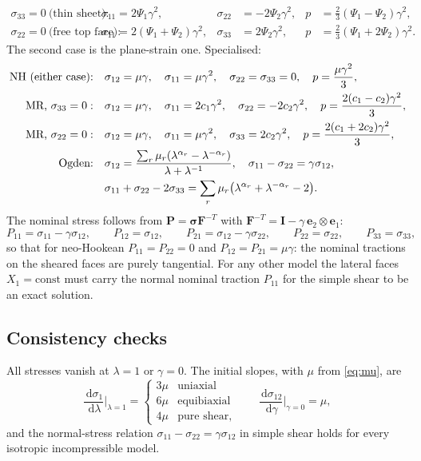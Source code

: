 \documentclass[11pt]{article}
\newcommand{\ud}{\,\mathrm{d}}
\newcommand{\be}{\bm{e}}
\newcommand{\bsig}{\bm{\sigma}}
\newcommand{\bP}{\bm{P}}
\newcommand{\bF}{\bm{F}}
\newcommand{\bI}{\bm{I}}
\newcommand{\Pone}{\Psi_{1}}
\newcommand{\Ptwo}{\Psi_{2}}
\begin{document}
\begin{align}
  \sigma_{33} = 0\ \text{(thin sheet):}\quad &
  \sigma_{11} = 2\Pone\gamma^2, & \sigma_{22} &= -2\Ptwo\gamma^2, &
  p &= \tfrac23(\Pone - \Ptwo)\gamma^2, \\
  \sigma_{22} = 0\ \text{(free top face):}\quad &
  \sigma_{11} = 2(\Pone + \Ptwo)\gamma^2, & \sigma_{33} &= 2\Ptwo\gamma^2, &
  p &= \tfrac23(\Pone + 2\Ptwo)\gamma^2 .
\end{align}
The second case is the plane-strain one.
Specialised:
\begin{align}
  \text{NH (either case):}\quad & \sigma_{12} = \mu\gamma, \quad \sigma_{11} = \mu\gamma^2, \quad
  \sigma_{22} = \sigma_{33} = 0, \quad p = \frac{\mu\gamma^2}{3}, \\
  \text{MR, } \sigma_{33} = 0:\quad & \sigma_{12} = \mu\gamma, \quad \sigma_{11} = 2c_1\gamma^2, \quad
  \sigma_{22} = -2c_2\gamma^2, \quad p = \frac{2(c_1 - c_2)\gamma^2}{3}, \\
  \text{MR, } \sigma_{22} = 0:\quad & \sigma_{12} = \mu\gamma, \quad \sigma_{11} = \mu\gamma^2, \quad
  \sigma_{33} = 2c_2\gamma^2, \quad p = \frac{2(c_1 + 2c_2)\gamma^2}{3}, \\
  \text{Ogden:}\quad & \sigma_{12} = \frac{\sum_r\mu_r(\lambda^{\alpha_r} - \lambda^{-\alpha_r})}{\lambda + \lambda^{-1}}, \quad
  \sigma_{11} - \sigma_{22} = \gamma\sigma_{12}, \notag \\
  & \sigma_{11} + \sigma_{22} - 2\sigma_{33} = \sum_r\mu_r\bigl(\lambda^{\alpha_r} + \lambda^{-\alpha_r} - 2\bigr).
\end{align}
The nominal stress follows from $\bP = \bsig\bF^{-T}$ with
$\bF^{-T} = \bI - \gamma\,\be_2\otimes\be_1$:
\begin{equation}
  P_{11} = \sigma_{11} - \gamma\sigma_{12}, \qquad
  P_{12} = \sigma_{12}, \qquad
  P_{21} = \sigma_{12} - \gamma\sigma_{22}, \qquad
  P_{22} = \sigma_{22}, \qquad
  P_{33} = \sigma_{33},
\end{equation}
so that for neo-Hookean $P_{11} = P_{22} = 0$ and $P_{12} = P_{21} = \mu\gamma$:
the nominal tractions on the sheared faces are purely tangential.  For any
other model the lateral faces $X_1 = \text{const}$ must carry the normal
nominal traction $P_{11}$ for the simple shear to be an exact solution.

\subsection{Consistency checks}
All stresses vanish at $\lambda = 1$ or $\gamma = 0$.  The initial slopes,
with $\mu$ from \eqref{eq:mu}, are
\begin{equation}
  \frac{\ud\sigma_1}{\ud\lambda}\Big|_{\lambda=1} =
  \begin{cases} 3\mu & \text{uniaxial} \\ 6\mu & \text{equibiaxial} \\ 4\mu & \text{pure shear}, \end{cases}
  \qquad
  \frac{\ud\sigma_{12}}{\ud\gamma}\Big|_{\gamma=0} = \mu ,
\end{equation}
and the normal-stress relation $\sigma_{11} - \sigma_{22} = \gamma\sigma_{12}$
in simple shear holds for every isotropic incompressible model.
\end{document}
